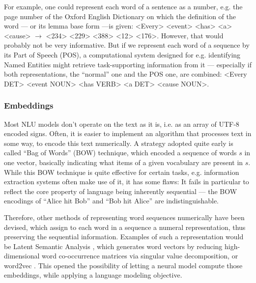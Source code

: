 For example, one could represent each word of a sentence as a number, e.g. the page number
of the Oxford English Dictionary on which the definition of the word --- or its lemma base
form ---is given: <Every> <event> <has> <a> <cause> $\rightarrow$ <234> <229> <388> <12>
<176>. However, that would probably not be very informative. But if we represent each word
of a sequence by its Part of Speech (POS), a computational system designed for e.g. identifying
Named Entities might retrieve task-supporting information from it --- especially if both
representations, the ``normal'' one and the POS one, are combined: <Every DET> <event NOUN>
<has VERB> <a DET> <cause NOUN>.


\subsubsection*{Embeddings}


Most NLU models don't operate on the text as it is, i.e. as an array of UTF-8 encoded
signs. Often, it is easier to implement an algorithm that processes text in some way, to
encode this text numerically. A strategy adopted quite early is called ``Bag of
Words'' (BOW) \citep{harris1954distributional} technique, which encoded a sequence of words $s$
in one vector, basically indicating what items of a given vocabulary are present in $s$.
While this BOW technique is quite effective for certain tasks, e.g. information extraction
systems often make use of it, it has some flaws: It fails in particular to reflect the core
property of language being inherently sequential --- the BOW encodings of ``Alice hit Bob''
and ``Bob hit Alice'' are indistinguishable.

Therefore, other methods of representing word sequences numerically have been devised, which assign
to each word in a sequence a numeral representation, thus preserving the sequential information.
Examples of such a representation would be Latent Semantic Analysis \citep{furnas1988using}, which
generates word vectors by reducing high-dimensional word co-occurrence matrices via singular value
decomposition, or word2vec \citep{mikolov2013distributed}. This opened the possibility of letting a
neural model compute those embeddings, while applying a language modeling objective.


